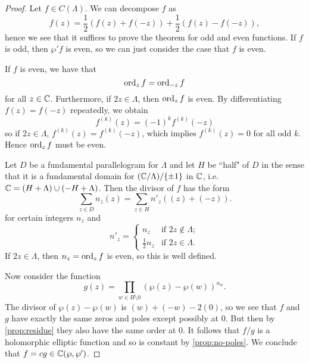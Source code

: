 \begin{proof}
	Let $f \in C(\Lambda)$. We can decompose $f$ as
	\begin{equation*}
		f(z) = \frac{1}{2}(f(z) + f (-z)) + \frac{1}{2}(f(z) - f(-z)),
	\end{equation*}
	hence we see that it suffices to prove the theorem for odd and even
	functions. If $f$ is odd, then $\wp'f$ is even, so we can just consider
	the case that $f$ is even.

	If $f$ is even, we have that
	\begin{equation*}
		\operatorname{ord}_z f = \operatorname{ord}_{-z} f
	\end{equation*}
	for all $z\in \mathbb{C}$. Furthermore, if $2z \in \Lambda$, then
	$\operatorname{ord}_z f$ is even. By differentiating $f(z) = f(-z)$ repeatedly,
	we obtain
	\begin{equation*}
		f^{(k)}(z) = (-1)^kf^{(k)}(-z)
	\end{equation*}
	so if $2z \in \Lambda$, $f^{(k)}(z) = f^{(k)}(-z)$, which implies
	$f^{(k)}(z) = 0$ for all odd $k$. Hence $\operatorname{ord}_z f$ must be even.

	Let $D$ be a fundamental parallelogram for $\Lambda$ and let $H$ 
	be ``half" of $D$ in the sense that it is a fundamental domain for
	$(\mathbb{C}/\Lambda)/\{\pm 1\}$ in $\mathbb{C}$,
	i.e. $\mathbb{C} = (H + \Lambda) \cup (-H + \Lambda)$.
	Then the divisor of $f$ has the form
	\begin{equation*}
		\sum_{z \in D} n_z(z) = \sum_{z \in H} n'_z((z) + (-z)).
	\end{equation*}
	for certain integers $n_z$ and
	\begin{equation*}
		n'_z =
		\begin{cases}
			n_z &\textrm{if } 2z \notin \Lambda;\\
			\frac{1}{2}n_z &\textrm{if } 2z \in \Lambda.
		\end{cases}
	\end{equation*}
	If $2z \in \Lambda$, then
	$n_z = \operatorname{ord}_z f$ is even, so this is well defined.

	Now consider the function
	\begin{equation*}
		g(z) = \prod_{w \in H\setminus 0}(\wp(z) - \wp(w))^{n_w}.
	\end{equation*}
	The divisor of $\wp(z) - \wp(w)$ is $(w) + (-w) - 2(0)$, so we see that
	$f$ and $g$ have exactly the same zeros and poles except possibly at
	$0$. But then by \ref{prop:residue} they also have the same order at $0$.
	It follows that $f/g$ is a holomorphic elliptic function and so is constant
	by \ref{prop:no-poles}.
	We conclude that $f = cg \in \mathbb{C}(\wp, \wp')$.
\end{proof}

